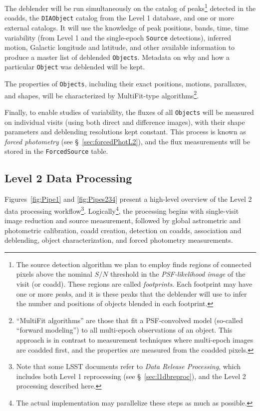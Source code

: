 \documentclass[12pt]{article}
\newcommand{\code}[1]{\texttt{#1}}
\newcommand{\DIAObject}{\code{DIAObject}\xspace}
\newcommand{\DB}{{Level 1 database}\xspace}
\newcommand{\Object}{\code{Object}\xspace}
\newcommand{\Objects}{\code{Objects}\xspace}
\newcommand{\Source}{\code{Source}\xspace}
\newcommand{\ForcedSource}{\code{ForcedSource}\xspace}
\begin{document}
The deblender will be run simultaneously on the catalog of peaks\footnote{The source detection algorithm we plan to employ finds regions of connected pixels above the nominal $S/N$ threshold in the {\em PSF-likelihood image} of the visit (or coadd). These regions are called {\em footprints}. Each footprint may have one or more {\em peaks}, and it is these peaks that the deblender will use to infer the number and positions of objects blended in each footprint.} detected in the coadds, the \DIAObject catalog from the \DB, and one or more external catalogs.  It will use the knowledge of peak positions, bands, time, time variability (from Level 1 and the single-epoch \Source detections), inferred motion, Galactic longitude and latitude, and other available information to produce a master list of deblended \Objects. Metadata on why and how a particular \Object was deblended will be kept.

The properties of \Objects, including their exact positions, motions, parallaxes, and shapes, will be characterized by MultiFit-type algorithms\footnote{``MultiFit algorithms'' are those that fit a PSF-convolved model (so-called ``forward modeling'')  to all multi-epoch observations of an object. This approach is in contrast to measurement techniques where multi-epoch images are coadded first, and the properties are measured from the coadded pixels.}.

Finally, to enable studies of variability, the fluxes of all \Objects will be measured on individual visits (using both
direct and difference images), with their shape parameters and deblending resolutions kept constant. This process is known as {\em forced photometry} (see \S~\ref{sec:forcedPhotL2}), and the flux measurements will be stored in the \ForcedSource table.

\subsection{Level 2 Data Processing}
\label{sec:level2dp}


Figures~\ref{fig:Pipe1} and \ref{fig:Pipes234}
present a high-level overview of the Level 2 data processing workflow\footnote{Note that some LSST documents refer to {\em Data Release Processing}, which includes both Level 1 reprocessing (see \S~\ref{sec:l1dbreproc}), and the Level 2 processing described here.}. Logically\footnote{The actual implementation may parallelize these steps as much as possible.}, the processing begins with single-visit image reduction and source measurement, followed by global astrometric and photometric calibration, coadd creation, detection on coadds, association and deblending, object characterization, and forced photometry measurements.
\end{document}
